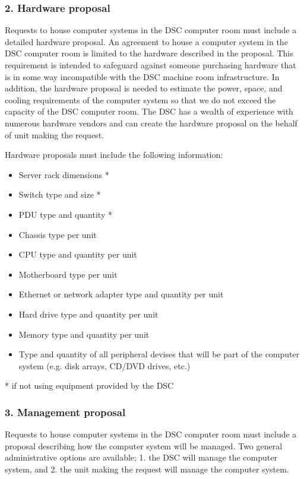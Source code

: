\documentclass[12pt,a4paper]{article}
\begin{document}
\subsubsection*{2. Hardware proposal}
Requests to house computer systems in the DSC computer room must include a detailed hardware proposal. An agreement to house a computer system in the DSC computer room is limited to the hardware described in the proposal. This requirement is intended to safeguard against someone purchasing hardware that is in some way incompatible with the DSC machine room infrastructure. In addition, the hardware proposal is needed to estimate the power, space, and cooling requirements of the computer system so that we do not exceed the capacity of the DSC computer room. The DSC has a wealth of experience with numerous hardware vendors and can create the hardware proposal on the behalf of unit making the request.

Hardware proposals must include the following information:
\begin{itemize}
    \item Server rack dimensions *
    \item Switch type and size *
    \item PDU type and quantity *
    \item Chassis type per unit
    \item CPU type and quantity per unit
    \item Motherboard type per unit
    \item Ethernet or network adapter type and quantity per unit
    \item Hard drive type and quantity per unit
    \item Memory type and quantity per unit
    \item Type and quantity of all peripheral devises that will be part of the computer system (e.g. disk arrays, CD/DVD drives, etc.)
\end{itemize}
* if not using equipment provided by the DSC

\subsubsection*{3. Management proposal}
Requests to house computer systems in the DSC computer room must include a proposal describing how the computer system will be managed. Two general administrative options are available; 1. the DSC will manage the computer system, and 2. the unit making the request will manage the computer system.
\end{document}
